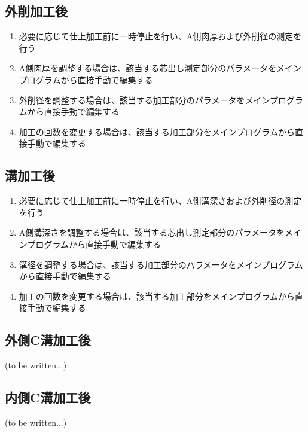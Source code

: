 \subsection{外削加工後}
\begin{enumerate}
\item 必要に応じて仕上加工前に一時停止を行い、A側肉厚および外削径の測定を行う
\item A側肉厚を調整する場合は、該当する芯出し測定部分のパラメータをメインプログラムから直接手動で編集する
\item 外削径を調整する場合は、該当する加工部分のパラメータをメインプログラムから直接手動で編集する
\item 加工の回数を変更する場合は、該当する加工部分をメインプログラムから直接手動で編集する
\end{enumerate}


\subsection{溝加工後\TBW}
\begin{enumerate}
\item 必要に応じて仕上加工前に一時停止を行い、A側溝深さおよび外削径の測定を行う
\item A側溝深さを調整する場合は、該当する芯出し測定部分のパラメータをメインプログラムから直接手動で編集する
\item 溝径を調整する場合は、該当する加工部分のパラメータをメインプログラムから直接手動で編集する
\item 加工の回数を変更する場合は、該当する加工部分をメインプログラムから直接手動で編集する
\end{enumerate}


\subsection{外側C溝加工後\TBW}
(to be written...)


\subsection{内側C溝加工後\TBW}
(to be written...)


